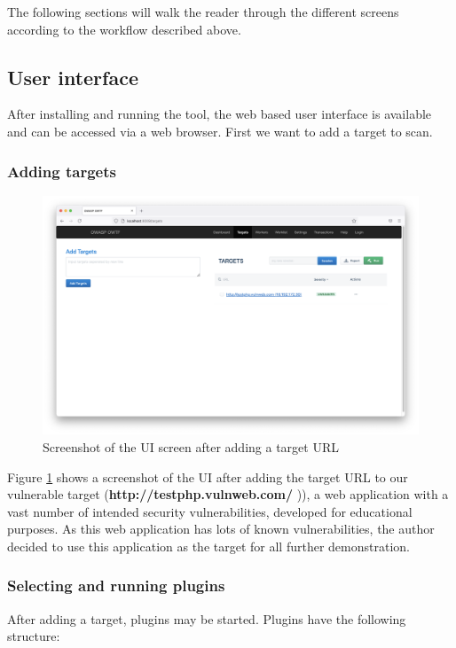 The following sections will walk the reader through the different screens according to the workflow described above.

\subsection{User interface}

After installing and running the tool, the web based user interface is available and can be accessed via a web browser. First we want to add a target to scan.

\subsubsection{Adding targets}

\begin{figure}[H]
	\centering
	\includegraphics[width=12cm,keepaspectratio=true]{pictures/ui1.png}
	\caption{
		Screenshot of the UI screen after adding a target URL
	}
	\label{fig:ui1}
\end{figure}

Figure \ref{fig:ui1} shows a screenshot of the UI after adding the target URL to our vulnerable target (\textbf{http://testphp.vulnweb.com/} \cite{TestPHP.11.06.2021})), a web application with a vast number of intended security vulnerabilities, developed for educational purposes. As this web application has lots of known vulnerabilities, the author decided to use this application as the target for all further demonstration.

\subsubsection{Selecting and running plugins}

After adding a target, plugins may be started. Plugins have the following structure:\\


